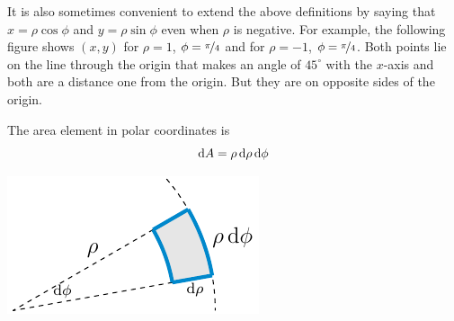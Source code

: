 It is also sometimes convenient to extend the above definitions by saying that
$x=\rho\cos\phi$ and $y=\rho\sin\phi$ even when $\rho$ is negative. For example,
the following figure shows $(x,y)$ for $\rho=1$, $\phi=\nicefrac{\pi}{4}$
and for $\rho=-1$, $\phi=\nicefrac{\pi}{4}$.
Both points lie on the  line through the origin that makes an angle of
$45^\circ$ with the $x$-axis and both are a distance one from the origin.
But they are on opposite sides of the origin.

The area element in polar coordinates is
\begin{equation*}
\mathrm{d}A = \rho\,\mathrm{d}\rho\,\mathrm{d}\phi
\end{equation*}
\begin{efig}
\begin{center}
    \includegraphics{polarA.pdf}
\end{center}
\end{efig}






